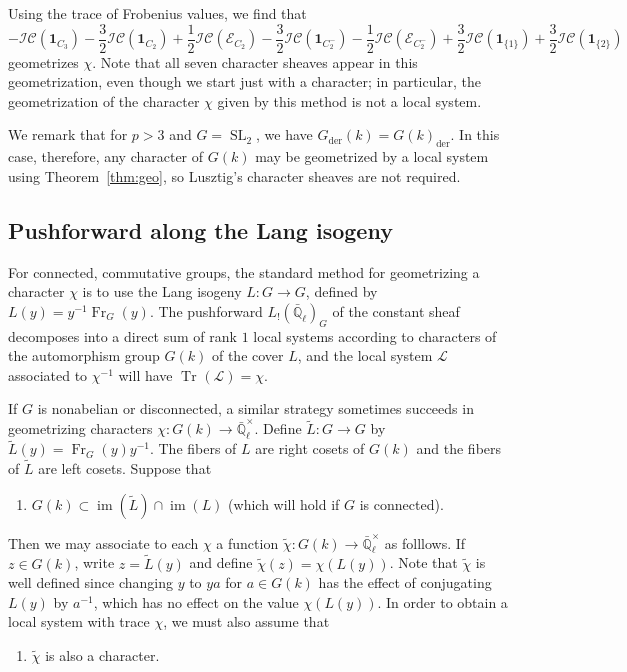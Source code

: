 \documentclass[10pt]{amsart}
\makeatletter
\theoremstyle{plain}
\theoremstyle{definition}
\newcommand{\EE}{\mathbb{\bar Q}_\ell}
\newcommand{\EEx}{\EE^\times}
\newcommand{\Frob}[1]{\operatorname{Fr}_{#1}}
\DeclareMathOperator{\image}{im}
\DeclareMathOperator{\SL}{SL}
\newcommand{\der}{_{\operatorname{der}}}
\DeclareMathOperator{\Tr}{Tr}
\newcommand{\TrFrob}[1]{\Tr_{#1}}
\newcommand{\cs}[1]{{\mathcal{#1}}}
\newcommand{\IC}{\mathcal{IC}}
\newcommand{\labitem}[2]{
\def\@itemlabel{\textbf{#1}}
\item
\def\@currentlabel{#1}\label{#2}}
\makeatother
\begin{document}
\vspace{0.1in}
\noindent Using the trace of Frobenius values, we find that 
\[
- \IC(\mathbf{1}_{C_3}) - \frac32 \IC(\mathbf{1}_{C_2}) + \frac12 \IC(\cs{E}_{C_2}) - \frac32 \IC(\mathbf{1}_{C_2^-}) - \frac12 \IC(\cs{E}_{C_2^-}) + \frac32 \IC(\mathbf{1}_{\{1\}}) + \frac32 \IC(\mathbf{1}_{\{2\}})
\]
geometrizes $\chi$.  
%
Note that all seven character sheaves appear in this geometrization, even though we start just with a character; in particular, the geometrization of the character $\chi$ given by this method is not a local system.

We remark that for $p > 3$ and $G = \SL_2$, we have $G\der(k) = G(k)\der$.
In this case, therefore, any character of $G(k)$ may be geometrized by a local system using Theorem~\ref{thm:geo}, so Lusztig's character sheaves are not required.


\subsection{Pushforward along the Lang isogeny} \label{ssec:Lang_pushforward}

For connected, commutative groups, the standard method for geometrizing a character $\chi$ is to use the Lang isogeny $L : G \to G$, defined by $L(y) = y^{-1}\Frob{G}(y)$.  The pushforward $L_! (\EE)_G$ of the constant sheaf decomposes into a direct sum of rank $1$ local systems according to characters of the automorphism group $G(k)$ of the cover $L$, and the local system $\cs{L}$ associated to $\chi^{-1}$ will have $\TrFrob{}(\cs{L}) = \chi$.

If $G$ is nonabelian or disconnected, a similar strategy sometimes succeeds in geometrizing characters $\chi : G(k) \to \EEx$.
Define $\tilde{L} : G \to G$ by $\tilde{L}(y) = \Frob{G}(y)y^{-1}$.
The fibers of $L$ are right cosets of $G(k)$ and the fibers of $\tilde{L}$ are left cosets.
Suppose that
\begin{enumerate}
\labitem{(L.1)}{L.1} $G(k) \subset \image(\tilde{L}) \cap \image(L)$ (which will hold if $G$ is connected).
\end{enumerate}
Then we may associate to each $\chi$ a function $\tilde{\chi} : G(k) \to \EEx$ as folllows.
If $z \in G(k)$, write $z = \tilde{L}(y)$ and define $\tilde{\chi}(z) = \chi(L(y))$.
Note that $\tilde{\chi}$ is well defined since changing $y$ to $ya$ for $a \in G(k)$ has the
effect of conjugating $L(y)$ by $a^{-1}$, which has no effect on the value $\chi(L(y))$.
In order to obtain a local system with trace $\chi$, we must also assume that
\begin{enumerate}
\labitem{(L.2)}{L.2} $\tilde{\chi}$ is also a character.
\end{enumerate}
\end{document}
